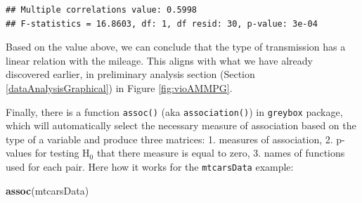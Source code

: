 \documentclass[
]{book}
\newenvironment{Shaded}{\begin{snugshade}}{\end{snugshade}}
\newcommand{\FunctionTok}[1]{\textcolor[rgb]{0.13,0.29,0.53}{\textbf{#1}}}
\newcommand{\NormalTok}[1]{#1}
\newcommand{\SpecialCharTok}[1]{\textcolor[rgb]{0.81,0.36,0.00}{\textbf{#1}}}
\theoremstyle{definition}
\theoremstyle{definition}
\theoremstyle{definition}
\theoremstyle{definition}
\theoremstyle{remark}
\begin{document}
\begin{Shaded}
\end{Shaded}

\begin{verbatim}
## Multiple correlations value: 0.5998
## F-statistics = 16.8603, df: 1, df resid: 30, p-value: 3e-04
\end{verbatim}

Based on the value above, we can conclude that the type of transmission has a linear relation with the mileage. This aligns with what we have already discovered earlier, in preliminary analysis section (Section \ref{dataAnalysisGraphical}) in Figure \ref{fig:vioAMMPG}.

Finally, there is a function \texttt{assoc()} (aka \texttt{association()}) in \texttt{greybox} package, which will automatically select the necessary measure of association based on the type of a variable and produce three matrices: 1. measures of association, 2. p-values for testing H\(_0\) that there measure is equal to zero, 3. names of functions used for each pair. Here how it works for the \texttt{mtcarsData} example:

\begin{Shaded}
\begin{Highlighting}[]
\FunctionTok{assoc}\NormalTok{(mtcarsData)}
\end{Highlighting}
\end{Shaded}
\end{document}
